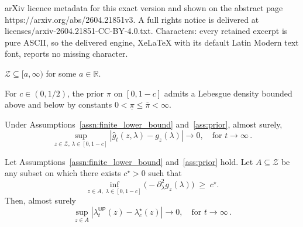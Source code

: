 \documentclass[10pt,a4paper]{amsart}
\newcommand{\R}{\mathbb{R}}
\newcommand{\calZ}{\mathcal{Z}}
\newcommand{\fbet}{\lambda}  %
\newcommand{\up}{\mathsf{UP}}
\begin{document}
arXiv licence metadata for this exact version and shown on the abstract page https://arxiv.org/abs/2604.21851v3. A full rights notice is delivered at licenses/arxiv-2604.21851-CC-BY-4.0.txt. Characters: every retained excerpt is pure ASCII, so the delivered engine, XeLaTeX with its default Latin Modern text font, reports no missing character.
\begin{assumption}\label{assn:finite_lower_bound}
    $\calZ \subseteq [a, \infty)$ for some $a \in \R$. 
\end{assumption}

\begin{assumption}\label{ass:prior}
For $c\in(0,1/2)$, the prior $\pi$ on $[0,1-c]$ admits a Lebesgue density
bounded above and below by constants $0<\underline\pi\le\overline\pi<\infty$.
\end{assumption}

\begin{lemma}\label{lem:uniformGC}
Under Assumptions~\ref{assn:finite_lower_bound} and~\ref{ass:prior}, almost surely,
\begin{equation*}
    \sup_{z\in\calZ,\,\lambda\in[0,1-c]}
    \left|\hat g_t(z,\lambda)-g_z(\lambda)\right|
    \to 0,\quad \textrm{for }t\to \infty\,.
\end{equation*}
\end{lemma}

\begin{lemma}\label{lem:posterior_concentration}
Let Assumptions~\ref{assn:finite_lower_bound} and~\ref{ass:prior} hold. Let $A\subseteq\calZ$ be any
subset on which there exists $c^\star>0$ such that
\begin{equation}\label{eq:uniform_curvature}
    \inf_{z\in A,\;\lambda\in[0,1-c]}\bigl(-\partial_\lambda^2 g_z(\lambda)\bigr) \;\ge\; c^\star.
\end{equation}
Then, almost surely
\begin{equation*}
    \sup_{z\in A}\left|\fbet_t^\up(z)-\fbet^\star_c(z)\right|
   \to0,\quad \text{for }t\to \infty\,.
\end{equation*}
\end{lemma}
\end{document}
